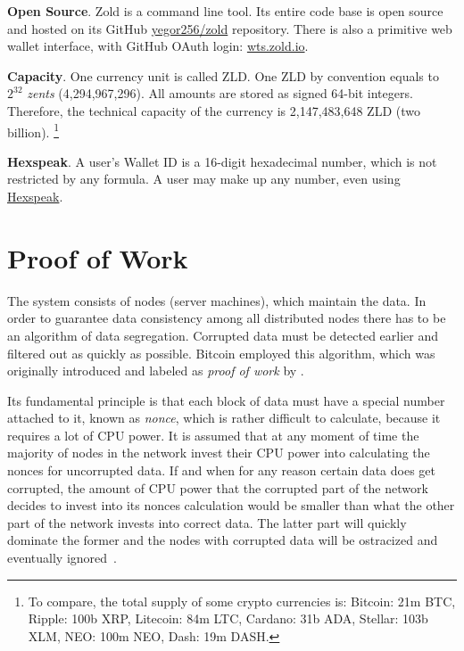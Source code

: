 \documentclass{main}
\begin{document}
\textbf{Open Source}.
Zold is a command line tool. Its entire code base is open source
and hosted on its GitHub \href{https://github.com/yegor256/zold}{yegor256/zold}
repository. There is also a primitive web wallet interface, with
GitHub OAuth login: \href{https://wts.zold.io}{wts.zold.io}.

\textbf{Capacity}.
One currency unit is called ZLD.
One ZLD by convention equals to $2^{32}$ \emph{zents} (4,294,967,296).
All amounts are stored as signed 64-bit integers.
Therefore, the technical capacity of the currency is 2,147,483,648 ZLD (two billion).%
\footnote{%
  To compare, the total supply of some crypto currencies is:
  Bitcoin: 21m BTC,
  Ripple: 100b XRP,
  Litecoin: 84m LTC,
  Cardano: 31b ADA,
  Stellar: 103b XLM,
  NEO: 100m NEO,
  Dash: 19m DASH.
}

\textbf{Hexspeak}.
A user's Wallet ID is a 16-digit hexadecimal number, which is not restricted by any formula.
A user may make up any number, even using
\href{https://en.wikipedia.org/wiki/Hexspeak}{Hexspeak}.

\section{Proof of Work}\label{sec:score}

The system consists of nodes (server machines), which maintain the data.
In order to guarantee data consistency among all distributed nodes
there has to be an algorithm of data segregation.
Corrupted data must be detected earlier and filtered out as quickly as possible.
Bitcoin employed this algorithm, which was originally introduced and labeled as
\emph{proof of work} by \textcite{back1997}.

Its fundamental principle is that each block of data must have a special
number attached to it, known as \emph{nonce}, which is rather difficult to calculate,
because it requires a lot of CPU power. It is assumed that at any moment
of time the majority of nodes in the network invest their CPU power into
calculating the nonces for uncorrupted data. If and when for any reason
certain data does get corrupted, the amount of CPU power that the corrupted part of the network
decides to invest into its nonces calculation would be smaller than what
the other part of the network invests into correct data. The latter part
will quickly dominate the former and the nodes with corrupted data will
be ostracized and eventually ignored~\parencite{nakamoto2008}.
\end{document}
